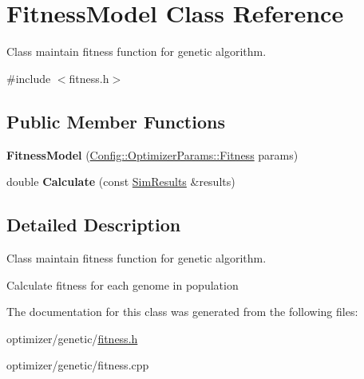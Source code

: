 \hypertarget{class_fitness_model}{}\section{Fitness\+Model Class Reference}
\label{class_fitness_model}


Class maintain fitness function for genetic algorithm.  




{\ttfamily \#include $<$fitness.\+h$>$}

\subsection*{Public Member Functions}
\begin{DoxyCompactItemize}
\item 
\hypertarget{class_fitness_model_a3965cdc6d87b01d3ecef12c9f9653995}{}\label{class_fitness_model_a3965cdc6d87b01d3ecef12c9f9653995} 
{\bfseries Fitness\+Model} (\hyperlink{struct_config_1_1_optimizer_params_1_1_fitness}{Config\+::\+Optimizer\+Params\+::\+Fitness} params)
\item 
\hypertarget{class_fitness_model_a25a721689cc99d5691a6e8ad8d36bbf6}{}\label{class_fitness_model_a25a721689cc99d5691a6e8ad8d36bbf6} 
double {\bfseries Calculate} (const \hyperlink{class_sim_results}{Sim\+Results} \&results)
\end{DoxyCompactItemize}


\subsection{Detailed Description}
Class maintain fitness function for genetic algorithm. 

Calculate fitness for each genome in population 

The documentation for this class was generated from the following files\+:\begin{DoxyCompactItemize}
\item 
optimizer/genetic/\hyperlink{fitness_8h}{fitness.\+h}\item 
optimizer/genetic/fitness.\+cpp\end{DoxyCompactItemize}
